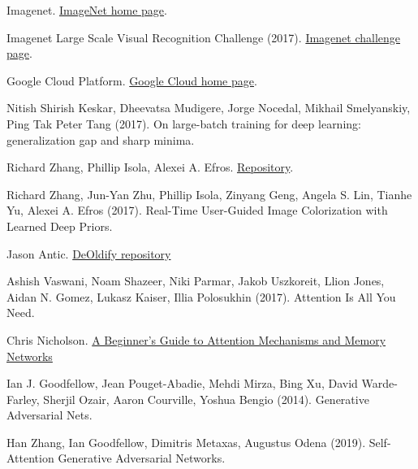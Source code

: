 \documentclass[twoside,twocolumn]{article}
\begin{document}
\begin{thebibliography}{99}
Imagenet.
\newblock \href{http://www.image-net.org/index}{ImageNet home page}.

Imagenet Large Scale Visual Recognition Challenge (2017).
\newblock \href{http://www.image-net.org/challenges/LSVRC/}{Imagenet challenge page}.

Google Cloud Platform.
\newblock \href{https://cloud.google.com/}{Google Cloud home page}.

Nitish Shirish Keskar, Dheevatsa Mudigere, Jorge Nocedal, Mikhail Smelyanskiy, Ping Tak Peter Tang (2017). 
\newblock On large-batch training for deep learning: generalization gap and sharp minima.

Richard Zhang, Phillip Isola, Alexei A. Efros.
\newblock \href{https://github.com/richzhang/colorization}{Repository}.

Richard Zhang, Jun-Yan Zhu, Phillip Isola, Zinyang Geng, Angela S. Lin, Tianhe Yu, Alexei A. Efros (2017).
\newblock Real-Time User-Guided Image Colorization with Learned Deep Priors.

Jason Antic.
\newblock \href{https://github.com/jantic/DeOldify}{DeOldify repository}

Ashish Vaswani, Noam Shazeer, Niki Parmar, Jakob Uszkoreit, Llion Jones, Aidan N. Gomez, Lukasz Kaiser, Illia Polosukhin (2017).
\newblock Attention Is All You Need.

Chris Nicholson.
\newblock \href{https://skymind.ai/wiki/attention-mechanism-memory-network}{A Beginner's Guide to Attention Mechanisms and Memory Networks}

Ian J. Goodfellow, Jean Pouget-Abadie, Mehdi Mirza, Bing Xu, David Warde-Farley,
Sherjil Ozair, Aaron Courville, Yoshua Bengio (2014).
\newblock Generative Adversarial Nets.

Han Zhang, Ian Goodfellow, Dimitris Metaxas, Augustus Odena (2019).
\newblock Self-Attention Generative Adversarial Networks.



\end{thebibliography}

\end{document}
